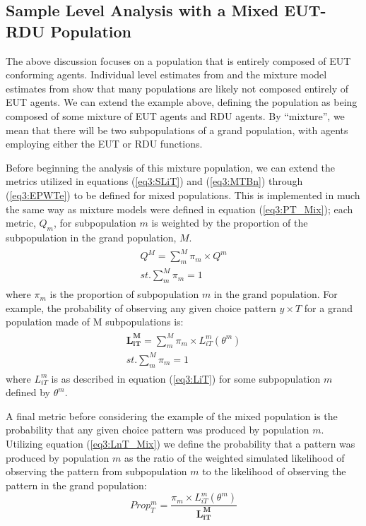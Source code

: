 \documentclass[../main.tex]{subfiles}
\begin{document}
\singlespacing
\subsection{Sample Level Analysis with a Mixed EUT-RDU Population}
\doublespacing

The above discussion focuses on a population that is entirely composed of EUT conforming agents.
Individual level estimates from \textcite{Hey1994} and the mixture model estimates from \textcite{Harrison2009} show that many populations are likely not composed entirely of EUT agents.
We can extend the example above, defining the population as being composed of some mixture of EUT agents and RDU agents.
By \enquote{mixture}, we mean that there will be two subpopulations of a grand population, with agents employing either the EUT or RDU functions.

Before beginning the analysis of this mixture population, we can extend the metrics utilized in equations (\ref{eq3:SLiT}) and (\ref{eq3:MTBn}) through (\ref{eq3:EPWTe}) to be defined for mixed populations.
This is implemented in much the same way as mixture models were defined in equation (\ref{eq3:PT_Mix}); each metric, $Q_m$, for subpopulation $m$ is weighted by the proportion of the subpopulation in the grand population, $M$.
\begin{align}
	\label{eq3:Metric_Mix}
	\begin{split}
		\bm{\mathit{Q^M}} = \sum_m^M \pi_m \times Q^m \\
		\mathit{st.} \sum_m^M \pi_m = 1
	\end{split}
\end{align}
\noindent where $\pi_m$ is the proportion of subpopulation $m$ in the grand population.
For example, the probability of observing any given choice pattern $y \times T$ for a grand population made of M subpopulations is:
\begin{align}
	\label{eq3:LnT_Mix}
	\begin{split}
		\bm{L_{iT}^M} = \sum_m^M \pi_m \times L_{iT}^m(\theta^m) \\
		\mathit{st.} \sum_m^M \pi_m = 1
	\end{split}
\end{align}
\noindent where $L_{iT}^m$ is as described in equation (\ref{eq3:LiT}) for some subpopulation $m$ defined by $\theta^m$.

A final metric before considering the example of the mixed population is the probability that any given choice pattern was produced by population $m$.
Utilizing equation (\ref{eq3:LnT_Mix}) we define the probability that a pattern was produced by population $m$ as the ratio of the weighted simulated likelihood of observing the pattern from subpopulation $m$ to the likelihood of observing the pattern in the grand population:
\begin{equation}
	\label{eq3:Propm}
	\mathit{Prop^m_{T}} = \frac{\pi_m \times L_{iT}^m(\theta^m) }{\bm{L_{iT}^M}}
\end{equation}
\end{document}

